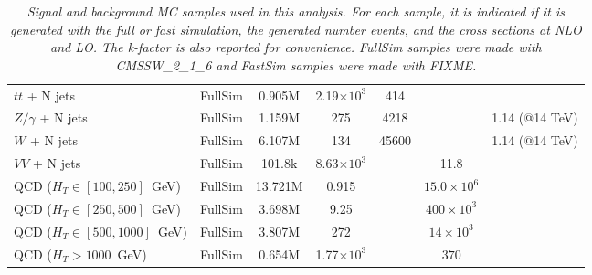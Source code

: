 \begin{table}[htb]
\begin{center}
\begin{tabular}{|l|cccccc|}
      $t\bar{t}$ + N jets         & FullSim      & 0.905M    &    2.19$\times 10^3$   & 414                 &                    & \\
      $Z/\gamma$ + N jets         & FullSim      & 1.159M    &     275	              & 4218                &                    & 1.14 (@14 TeV)\\
      $W$ + N jets                & FullSim      & 6.107M    &     134	              & 45600               &                    & 1.14 (@14 TeV)\\
      $VV$ + N jets               & FullSim      & 101.8k    &    8.63$\times 10^3$   &                     & 11.8               & \\ \hline
      QCD ($H_T\in[100,250]$~GeV) & FullSim      & 13.721M   &    0.915	              &                     & $15.0 \times 10^6$ & \\
      QCD ($H_T\in[250,500]$~GeV) & FullSim      & 3.698M    &       9.25	      &                     & $400 \times 10^3$  & \\
      QCD ($H_T\in[500,1000]$~GeV)& FullSim      & 3.807M    &     272	              &                     &  $14 \times 10^3$  & \\
      QCD ($H_T>1000$~GeV)        & FullSim      & 0.654M    &    1.77$\times 10^3$   &                     & $370$              & \\
       \hline\hline
    \end{tabular}
    \caption{\small \sl Signal and background MC samples used in this analysis. For each sample, it is indicated 
      if it is generated with the full or fast simulation, the generated number events, and the cross sections at NLO and LO. 
      The k-factor is also reported for convenience.
      FullSim samples were made with CMSSW\_2\_1\_6 and FastSim samples were made with FIXME.}
  \end{center}
\end{table}

 


